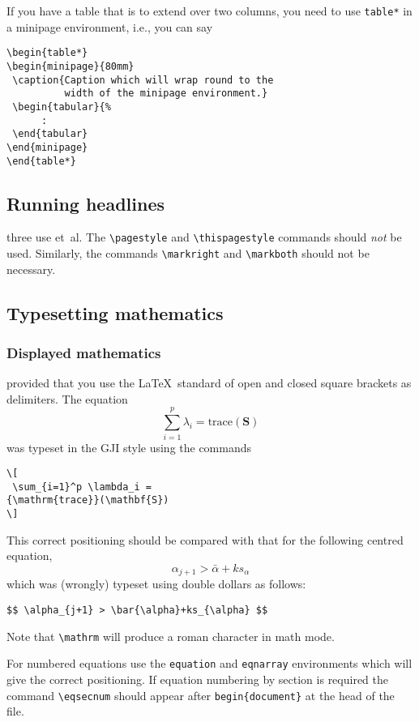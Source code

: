 If you have a table that is to extend over two columns, you need to use
\verb"table*" in a minipage environment, i.e., you can say
\begin{verbatim}
\begin{table*}
\begin{minipage}{80mm}
 \caption{Caption which will wrap round to the
          width of the minipage environment.}
 \begin{tabular}{%
      :
 \end{tabular}
\end{minipage}
\end{table*}
\end{verbatim}

\subsection{Running headlines}

three use et~al. The \verb"\pagestyle" and \verb"\thispagestyle"
commands should {\em not\/} be used. Similarly, the commands
\verb"\markright" and \verb"\markboth" should not be necessary.

\subsection{Typesetting mathematics}

\subsubsection{Displayed mathematics}

provided that you use the \LaTeX\ standard of open and closed square brackets
as delimiters. The equation
\[
 \sum_{i=1}^p \lambda_i =
{\mathrm{trace}}(\mathbf{S})
\]
was typeset in the GJI style using the commands
\begin{verbatim}
\[
 \sum_{i=1}^p \lambda_i =
{\mathrm{trace}}(\mathbf{S})
\]
\end{verbatim}
This correct positioning should be compared with that for the following centred
equation, \[ \alpha_{j+1} > \bar{\alpha}+ks_{\alpha} \]
which was (wrongly) typeset using double dollars as follows:
\begin{verbatim}
$$ \alpha_{j+1} > \bar{\alpha}+ks_{\alpha} $$
\end{verbatim}
Note that \verb"\mathrm" will produce a roman character in math mode.

For numbered equations use the \verb"equation" and \verb"eqnarray" environments
which will give the correct positioning. If equation numbering by section is
required the command \verb"\eqsecnum" should appear after \verb"begin{document}"
at the head of the file.

